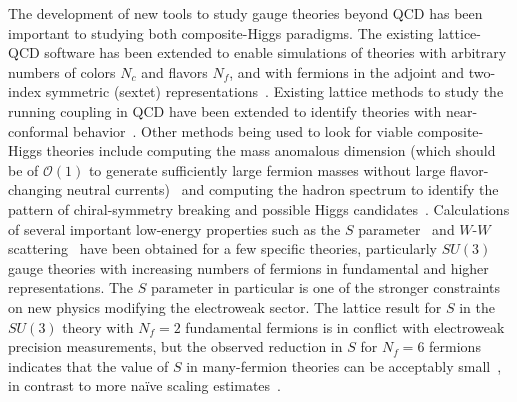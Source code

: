 \begin{itemize}
The development of new tools to study gauge theories beyond QCD has been
important to studying both composite-Higgs paradigms.  The existing
lattice-QCD software has been extended to enable simulations of theories with
arbitrary numbers of colors $N_c$ and flavors $N_f$, and with fermions in the
adjoint and two-index symmetric (sextet)
representations~\cite{DelDebbio:2010hu,Fodor:2012ni,DeGrand:2013uha}.
Existing lattice methods to study the running coupling in QCD have been
extended to identify theories with near-conformal
behavior~\cite{Appelquist:2007hu,Appelquist:2009ty,Bilgici:2009nm,Hasenfratz:2010fi,Fodor:2012td}.
Other methods being used to look for viable composite-Higgs theories include
computing the mass anomalous dimension (which should be of ${\mathcal O}(1)$
to generate sufficiently large fermion masses without large flavor-changing
neutral
currents)~\cite{Bursa:2010xr,Appelquist:2011dp,Cheng:2013eu,DeGrand:2013uha}
and computing the hadron spectrum to identify the pattern of chiral-symmetry
breaking and possible Higgs
candidates~\cite{Appelquist:2010xv,Fodor:2012et,Fodor:2012ty,Aoki:2013zsa}.
Calculations of several important low-energy properties such as the $S$
parameter~\cite{Appelquist:2010xv} and $W$-$W$
scattering~\cite{Appelquist:2012sm} have been obtained for a few specific
theories, particularly $SU(3)$ gauge theories with increasing numbers of
fermions in fundamental and higher representations.  The $S$ parameter in
particular is one of the stronger constraints on new physics modifying the
electroweak sector. The lattice result for $S$ in the $SU(3)$ theory with
$N_f=2$ fundamental fermions is in conflict with electroweak precision
measurements, but the observed reduction in $S$ for $N_f = 6$ fermions
indicates that the value of $S$ in many-fermion theories can be acceptably
small~\cite{Appelquist:2010xv}, in contrast to more na{\"i}ve scaling
estimates~\cite{Peskin:1990zt}.


\end{itemize}
